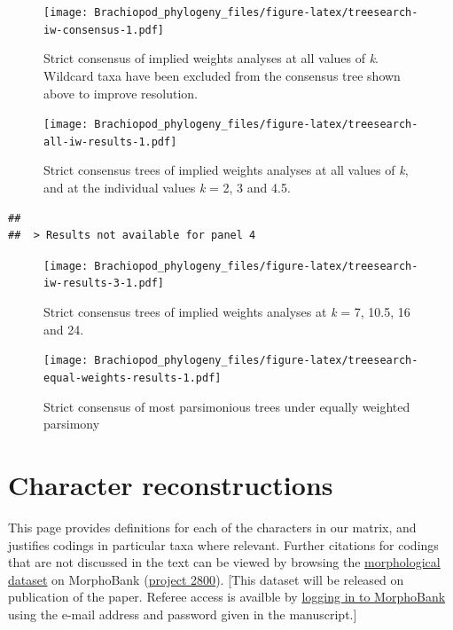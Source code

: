 \documentclass[openany]{book}
\begin{document}
\begin{figure}
\centering
\texttt{[image: Brachiopod\_phylogeny\_files/figure-latex/treesearch-iw-consensus-1.pdf]}
\caption{\label{fig:treesearch-iw-consensus}Strict consensus of implied weights analyses at all
values of \emph{k}. Wildcard taxa have been excluded from the consensus
tree shown above to improve resolution.}
\end{figure}








\clearpage 

\begin{figure}
\centering
\texttt{[image: Brachiopod\_phylogeny\_files/figure-latex/treesearch-all-iw-results-1.pdf]}
\caption{\label{fig:treesearch-all-iw-results}Strict consensus trees of implied weights analyses
at all values of \emph{k}, and at the individual
values \emph{k} = 2, 3 and 4.5.}
\end{figure}

\clearpage 

\begin{verbatim}
## 
##  > Results not available for panel 4
\end{verbatim}

\begin{figure}
\centering
\texttt{[image: Brachiopod\_phylogeny\_files/figure-latex/treesearch-iw-results-3-1.pdf]}
\caption{\label{fig:treesearch-iw-results-3}Strict consensus trees of implied weights analyses
at \emph{k} = 7, 10.5, 16 and 24.}
\end{figure}

\clearpage

\begin{figure}
\centering
\texttt{[image: Brachiopod\_phylogeny\_files/figure-latex/treesearch-equal-weights-results-1.pdf]}
\caption{\label{fig:treesearch-equal-weights-results}Strict consensus of
most parsimonious trees under equally weighted parsimony}
\end{figure}

\clearpage

\hypertarget{reconstructions}{\chapter{Character
reconstructions}\label{reconstructions}}

This page provides definitions for each of the characters in our matrix,
and justifies codings in particular taxa where relevant. Further
citations for codings that are not discussed in the text can be viewed
by browsing the \protect\hyperlink{dataset}{morphological dataset} on
MorphoBank (\href{https://morphobank.org/permalink/?P2800}{project
2800}). {[}This dataset will be released on publication of the paper.
Referee access is availble by
\href{https://morphobank.org/index.php/LoginReg/form}{logging in to
MorphoBank} using the e-mail address and password given in the
manuscript.{]}
\end{document}
